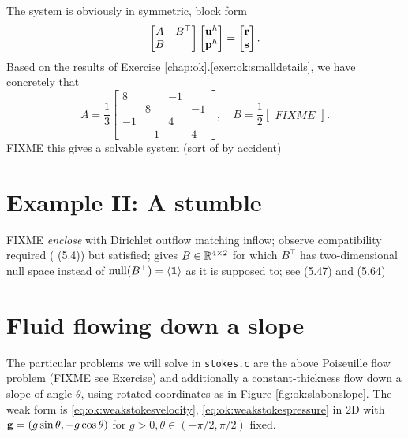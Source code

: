 The system is obviously in symmetric, block form
\begin{equation}
\begin{bmatrix}
A & B^\top \\
B &
\end{bmatrix} 
\begin{bmatrix}
\mathbf{u}^h \\ \mathbf{p}^h
\end{bmatrix}
=
\begin{bmatrix}
\mathbf{r} \\
\mathbf{s}
\end{bmatrix}.  \label{eq:ok:smallblockform}
\end{equation}
Based on the results of Exercise \ref{chap:ok}.\ref{exer:ok:smalldetails}, we have concretely that
    $$A = \frac{1}{3} \begin{bmatrix}
     8 &    & -1 &    \\
       &  8 &    & -1 \\
    -1 &    &  4 &    \\
       & -1 &    &  4
    \end{bmatrix},
    \quad
    B = \frac{1}{2} \begin{bmatrix}
     FIXME
    \end{bmatrix}.$$
FIXME  this gives a solvable system (sort of by accident)


\section{Example II: A stumble}

FIXME \emph{enclose} with Dirichlet outflow matching inflow; observe compatibility required (\citep{Elmanetal2005} (5.4)) but satisfied; gives $B \in \mathbb{R}^{4\times 2}$ for which $B^\top$ has two-dimensional null space instead of $\operatorname{null}(B^\top) = \left<\mathbf{1}\right>$ as it is supposed to; see \citep{Elmanetal2005} (5.47) and (5.64)



\clearpage
\newpage
\section{Fluid flowing down a slope}

The particular problems we will solve in \texttt{stokes.c} are the above Poiseuille flow problem (FIXME see Exercise) and additionally a constant-thickness flow down a slope of angle $\theta$, using rotated coordinates as in Figure \ref{fig:ok:slabonslope}.  The weak form is \eqref{eq:ok:weakstokesvelocity}, \eqref{eq:ok:weakstokespressure} in 2D with $\mathbf{g} = (g\sin\theta,-g\cos\theta)$ for $g>0,\theta\in(-\pi/2,\pi/2)$ fixed.

